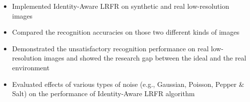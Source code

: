 \cventryspace
{}
\begin{itemize}
  \item Implemented Identity-Aware LRFR on synthetic and real low-resolution images
  \item Compared the recognition accuracies on those two different kinds of images
  \item Demonstrated the unsatisfactory recognition performance on real low-resolution images and showed the research gap between the ideal and the real environment
  \item Evaluated effects of various types of noise (e.g., Gaussian, Poisson, Pepper \& Salt) on the performance of Identity-Aware LRFR algorithm
\end{itemize}

\cventryspace
{}
